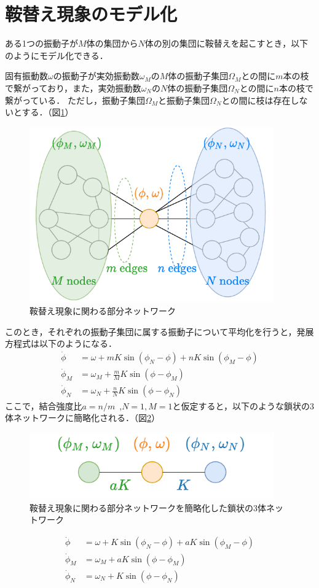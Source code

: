 \documentclass[../main]{subfiles}
\begin{document}
\section{鞍替え現象のモデル化}
ある1つの振動子が$M$体の集団から$N$体の別の集団に鞍替えを起こすとき，以下のようにモデル化できる．
\begin{screen}
固有振動数$\omega$の振動子が実効振動数$\omega_M$の$M$体の振動子集団$\Omega_M$との間に$m$本の枝で繋がっており，また，実効振動数$\omega_N$の$N$体の振動子集団$\Omega_N$との間に$n$本の枝で繋がっている．
ただし，振動子集団$\Omega_M$と振動子集団$\Omega_N$との間に枝は存在しないとする．（図\ref{fig:switch}）
\end{screen}
\begin{figure}[t]
\centering
\includegraphics[width=105mm]{./images/three_obj_before.pdf}
\centering
\caption{鞍替え現象に関わる部分ネットワーク}
\label{fig:switch}
\end{figure}
このとき，それぞれの振動子集団に属する振動子について平均化を行うと，発展方程式は以下のようになる．
\begin{align*}
    \dot{\phi}&=\omega+mK\sin\left( \phi_N-\phi \right)+nK\sin\left( \phi_M-\phi \right)\\
    \dot{\phi}_M&=\omega_M+\frac{m}{M}K\sin\left( \phi-\phi_M \right) \\
    \dot{\phi}_N&=\omega_N+\frac{n}{N}K\sin\left( \phi-\phi_N \right)    
\end{align*}
ここで，結合強度比$a=n/m$\ ,$N=1,M=1$と仮定すると，以下のような鎖状の3体ネットワークに簡略化される．（図\ref{fig:3body}）
\begin{figure}[t]
\centering
\includegraphics[width=105mm]{./images/three_obj_after.pdf}
\centering
\caption{鞍替え現象に関わる部分ネットワークを簡略化した鎖状の3体ネットワーク}
\label{fig:3body}
\end{figure}
\begin{align*}
    \dot{\phi}&=\omega+K\sin\left( \phi_N-\phi \right)+aK\sin\left( \phi_M-\phi \right)\\
    \dot{\phi}_M&=\omega_M+aK\sin\left( \phi-\phi_M \right) \\
    \dot{\phi}_N&=\omega_N+K\sin\left( \phi-\phi_N \right)    
\end{align*}
\end{document}
